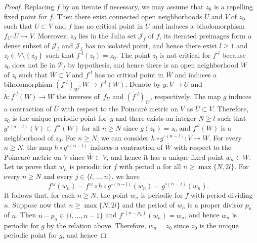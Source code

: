 \begin{proof}
Replacing $f$ by an iterate if necessary, we may assume that $z_{0}$ is a repelling fixed point for $f$. Then there exist connected open neighborhoods $U$ and $V$ of $z_{0}$ such that $\overline{U} \subset V$ and $f$ has no critical point in $\overline{U}$ and induces a biholomorphism $f_{U} \colon U \to V$. Moreover, $z_{0}$ lies in the Julia set $\mathcal{J}_{f}$ of $f$, its iterated preimages form a dense subset of $\mathcal{J}_{f}$ and $\mathcal{J}_{f}$ has no isolated point, and hence there exist $l \geq 1$ and $z_{l} \in V \setminus \left\lbrace z_{0} \right\rbrace$ such that $f^{\circ l}\left(z_{l} \right) = z_{0}$. The point $z_{l}$ is not critical for $f^{\circ l}$ because $z_{0}$ does not lie in $\mathcal{P}_{f}$ by hypothesis, and hence there is an open neighborhood $W$ of $z_{l}$ such that $\overline{W} \subset V$ and $f^{\circ l}$ has no critical point in $\overline{W}$ and induces a biholomorphism $\left(f^{\circ l} \right)_{W} \colon W \to f^{\circ l}(W)$. Denote by $g \colon V \to U$ and $h \colon f^{\circ l}(W) \to W$ the inverses of~$f_{U}$ and $\left(f^{\circ l} \right)_{W}$, respectively. The map $g$ induces a contraction of $\overline{U}$ with respect to the Poincaré metric on $V$ as $\overline{U} \subset V$. Therefore, $z_{0}$ is the unique periodic point for~$g$ and there exists an integer $N \geq l$ such that $g^{\circ (n -l)}(V) \subset f^{\circ l}(W)$ for all $n \geq N$ since $g(z_{0}) = z_{0}$ and $f^{\circ l}(W)$ is a neighborhood of $z_{0}$. For $n \geq N$, we can consider $h \circ g^{\circ (n -l)} \colon V \to W$. For every $n \geq N$, the map $h \circ g^{\circ (n -l)}$ induces a contraction of $\overline{W}$ with respect to the Poincaré metric on $V$ since $\overline{W} \subset V$, and hence it has a unique fixed point $w_{n} \in W$. Let us prove that $w_{n}$ is periodic for $f$ with period $n$ for all $n \geq \max\lbrace N, 2 l \rbrace$. For every $n \geq N$ and every $j \in \lbrace l, \dotsc, n \rbrace$, we have
\[
f^{\circ j}(w_{n}) = f^{\circ j} \circ h \circ g^{\circ (n -l)}(w_{n}) = g^{\circ (n -j)}(w_{n}).
\]
It follows that, for each $n \geq N$, the point $w_{n}$ is periodic for $f$ with period dividing $n$. Suppose now that $n \geq \max\lbrace N, 2 l \rbrace$ and the period of $w_{n}$ is a proper divisor $p_{n}$ of $n$. Then $n -p_{n} \in \lbrace l, \dotsc, n -1 \rbrace$ and $f^{\circ \left(n -p_{n} \right)}(w_{n}) = w_{n}$, and hence $w_{n}$ is periodic for $g$ by the relation above. Therefore, $w_{n} = z_{0}$ since $z_{0}$ is the unique periodic point for $g$, and hence

\end{proof}
